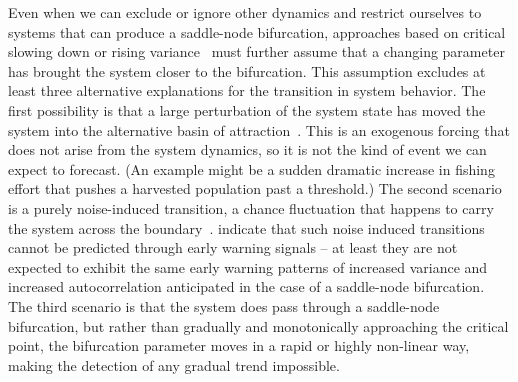 \documentclass[authoryear,review,11pt]{elsarticle}
\begin{document}
Even when we can exclude or ignore other dynamics and
restrict ourselves to systems that can produce a saddle-node bifurcation,
approaches based on critical slowing down or rising variance~\citep[\emph{e.g.}][]{Held2004, Scheffer2009, Carpenter2011}
must further assume that a changing parameter has brought the system closer to the bifurcation.
This assumption excludes at least three alternative explanations for the transition in system behavior.
The first possibility is that a large perturbation of the system state
has moved the system into the alternative basin of attraction~\citep{Scheffer2001}.
This is an exogenous forcing that does not arise from the system dynamics, so it is not the kind of event we can expect to forecast.
(An example might be a sudden dramatic increase in fishing effort that pushes a harvested population past a threshold.)
The second scenario is a purely noise-induced transition, a chance fluctuation that happens to carry the system across the boundary~\citep{Ditlevsen2010}.
\citet{Livina2012} indicate that such noise induced transitions cannot be predicted through early warning signals -- 
at least they are not expected to exhibit the same early warning patterns of increased variance and increased autocorrelation
anticipated in the case of a saddle-node bifurcation.
The third scenario is that the system does pass through a saddle-node bifurcation,
but rather than gradually and monotonically approaching the critical point, the
bifurcation parameter moves in a rapid or highly non-linear way, making the detection of any gradual trend impossible.


\end{document}
